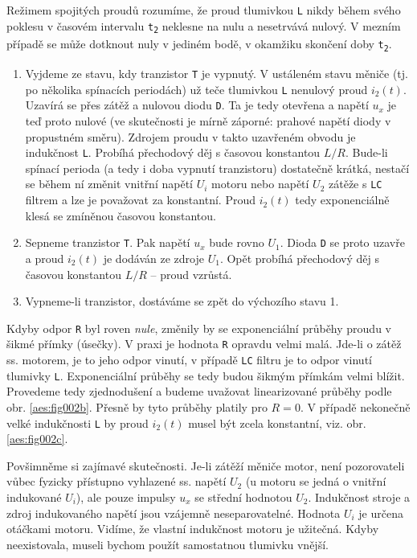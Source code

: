       Režimem spojitých proudů rozumíme, že proud tlumivkou \texttt{L} nikdy během svého poklesu v 
      časovém intervalu \texttt{t\textsubscript{2}} neklesne na nulu a nesetrvává nulový. V mezním 
      případě se může dotknout nuly v jediném bodě, v okamžiku skončení doby 
      \texttt{t\textsubscript{2}}.
      \begin{enumerate}
        \item Vyjdeme ze stavu, kdy tranzistor \texttt{T} je vypnutý. V ustáleném stavu měniče (tj. 
              po několika spínacích periodách) už teče tlumivkou \texttt{L} nenulový proud 
              \(i_2(t)\). Uzavírá se přes zátěž a nulovou diodu \texttt{D}. Ta je tedy otevřena a 
              napětí \(u_x\) je teď proto nulové (ve skutečnosti je mírně záporné: prahové napětí 
              diody v propustném směru). Zdrojem proudu v takto uzavřeném obvodu je indukčnost 
              \texttt{L}. Probíhá přechodový děj s časovou konstantou \(L/R\). Bude-li spínací 
              perioda (a tedy i doba vypnutí tranzistoru) dostatečně krátká, nestačí se během ní 
              změnit vnitřní napětí \(U_i\) motoru nebo napětí \(U_2\) zátěže s \texttt{LC} filtrem 
              a lze je považovat za konstantní. Proud \(i_2(t)\) tedy exponenciálně klesá se 
              zmíněnou časovou konstantou.
        \item Sepneme tranzistor \texttt{T}. Pak napětí \(u_x\) bude rovno \(U_1\). Dioda 
              \texttt{D} se proto uzavře a proud \(i_2(t)\) je dodáván ze zdroje \(U_1\). Opět 
              probíhá přechodový děj s časovou konstantou \(L/R\) – proud vzrůstá.
        \item Vypneme-li tranzistor, dostáváme se zpět do výchozího stavu 1.
      \end{enumerate}
      
      Kdyby odpor \texttt{R} byl roven \emph{nule}, změnily by se exponenciální průběhy proudu v 
      šikmé přímky (úsečky). V praxi je hodnota \texttt{R} opravdu velmi malá. Jde-li o zátěž ss. 
      motorem, je to jeho odpor vinutí, v případě \texttt{LC} filtru je to odpor vinutí tlumivky 
      \texttt{L}. Exponenciální průběhy se tedy budou šikmým přímkám velmi blížit. Provedeme tedy 
      zjednodušení a budeme uvažovat linearizované průběhy podle obr. \ref{aes:fig002b}.
      Přesně by tyto průběhy platily pro \(R = 0\). V případě nekonečně velké indukčnosti 
      \texttt{L} by proud \(i_2(t)\) musel být zcela konstantní, viz. obr. \ref{aes:fig002c}.
      
      \begin{note}
        Povšimněme si zajímavé skutečnosti. Je-li zátěží měniče motor, není pozorovateli vůbec 
        fyzicky přístupno vyhlazené ss. napětí \(U_2\) (u motoru se jedná o vnitřní indukované 
        \(U_i\)), ale pouze impulsy \(u_x\) se střední hodnotou \(U_2\). Indukčnost stroje a zdroj 
        indukovaného napětí jsou vzájemně neseparovatelné. Hodnota \(U_i\) je určena otáčkami 
        motoru. Vidíme, že vlastní indukčnost motoru je užitečná. Kdyby neexistovala, museli bychom 
        použít samostatnou tlumivku vnější.
      \end{note}
      
